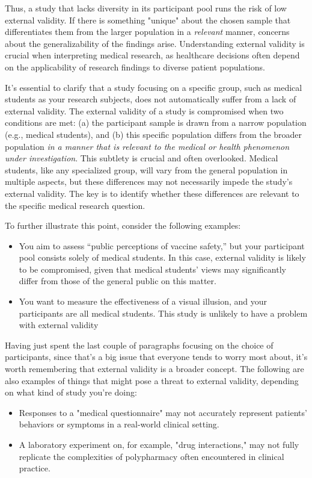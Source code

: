 Thus, a study that lacks diversity in its participant pool runs the risk of low external validity. If there is something "unique" about the chosen sample that differentiates them from the larger population in a \textit{relevant} manner, concerns about the generalizability of the findings arise. Understanding external validity is crucial when interpreting medical research, as healthcare decisions often depend on the applicability of research findings to diverse patient populations.

It's essential to clarify that a study focusing on a specific group, such as medical students as your research subjects, does not automatically suffer from a lack of external validity. The external validity of a study is compromised when two conditions are met: (a) the participant sample is drawn from a narrow population (e.g., medical students), and (b) this specific population differs from the broader population \textit{in a manner that is relevant to the medical or health phenomenon under investigation}. This subtlety is crucial and often overlooked. Medical students, like any specialized group, will vary from the general population in multiple aspects, but these differences may not necessarily impede the study's external validity. The key is to identify whether these differences are relevant to the specific medical research question.

To further illustrate this point, consider the following examples:

\begin{itemize}
\item You aim to assess ``public perceptions of vaccine safety,'' but your participant pool consists solely of medical students. In this case, external validity is likely to be compromised, given that medical students' views may significantly differ from those of the general public on this matter.
\item You want to measure the effectiveness of a visual illusion, and your participants are all medical students. This study is unlikely to have a problem with external validity
\end{itemize}

Having just spent the last couple of paragraphs focusing on the choice of participants, since that's a big issue that everyone tends to worry most about, it's worth remembering that external validity is a broader concept. The following are also examples of things that might pose a threat to external validity, depending on what kind of study you're doing:
\begin{itemize}
\item Responses to a "medical questionnaire" may not accurately represent patients' behaviors or symptoms in a real-world clinical setting.
\item A laboratory experiment on, for example, "drug interactions," may not fully replicate the complexities of polypharmacy often encountered in clinical practice.
\end{itemize}


